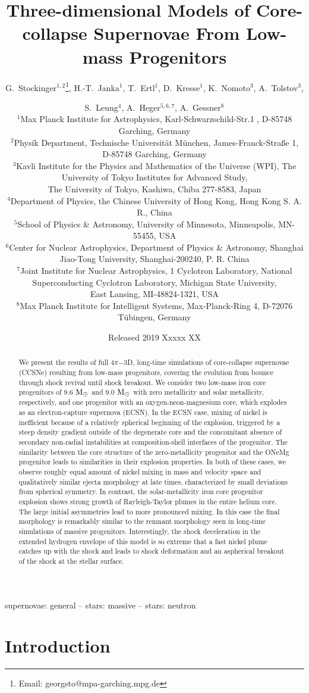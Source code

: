 \documentclass[fleqn,usenatbib]{mnras}
\title{Three-dimensional Models of Core-collapse Supernovae From Low-mass Progenitors}
\author[G. Stockinger et. al]{
 G.~Stockinger$^{1,2}$\thanks{Email: georgsto@mpa-garching.mpg.de},
 H.-T.~Janka$^1$,
 T.~Ertl$^1$,
 D.~Kresse$^1$,
 K.~Nomoto$^3$,
 A.~Tolstov$^3$,\and
 S.~Leung$^4$,
 A.~Heger$^{5,6,7}$,
 A.~Gessner$^8$
 \\
$^1$Max Planck Institute for Astrophysics, Karl-Schwarzschild-Str.1 , D-85748 Garching, Germany\\
$^2$Physik Department, Technische Universit\"at M\"unchen, James-Franck-Stra{\ss}e 1, D-85748 Garching, Germany\\
$^3$Kavli Institute for the Physics and Mathematics of the Universe (WPI), The University of Tokyo Institutes for Advanced Study,\\  \hspace{0.08cm} The University of Tokyo, Kashiwa, Chiba 277-8583, Japan\\
$^4$Department of Physics, the Chinese University of Hong Kong, Hong Kong S. A. R., China \\
$^5$School of Physics \& Astronomy, University of Minnesota, Minneapolis, MN-55455, USA \\
$^6$Center for Nuclear Astrophysics, Department of Physics \& Astronomy, Shanghai Jiao-Tong University, Shanghai-200240, P. R. China \\
$^7$Joint Institute for Nuclear Astrophysics, 1 Cyclotron Laboratory, National Superconducting Cyclotron Laboratory, Michigan State University,\\ \hspace{0.08cm} East Lansing, MI-48824-1321, USA \\
$^8$Max Planck Institute for Intelligent Systems, Max-Planck-Ring 4, D-72076 T\"ubingen, Germany \\
}
\date{Released 2019 Xxxxx XX}
\newcommand{\solm}{\ensuremath{\rm{M_{\odot}}}\xspace}
\begin{document}
\label{firstpage}
\pagerange{\pageref{firstpage}--\pageref{lastpage}}
\maketitle
{}

\begin{abstract}
We present the results of full $4\pi\mathord{-}$3D, long-time simulations 
of core-collapse supernovae (CCSNe) resulting from low-mass progenitors, 
covering the evolution from bounce through shock revival until shock breakout. 
We consider two low-mass iron core progenitors of 9.6 \solm and 9.0 \solm 
with zero metallicity and solar metallicity, respectively, and one 
progenitor with an oxygen-neon-magnesium core, which explodes as an 
electron-capture supernova (ECSN). In the ECSN case, mixing of nickel is 
inefficient because of a relatively spherical beginning of the explosion, 
triggered by a steep density gradient outside of the degenerate core and 
the concomitant absence of secondary non-radial instabilities at 
composition-shell interfaces of the progenitor. The similarity between the 
core structure of the zero-metallicity progenitor and the ONeMg progenitor 
leads to similarities in their explosion properties. In both of these cases, 
we observe roughly equal amount of nickel mixing in mass and velocity space 
and qualitatively similar ejecta morphology at late times, characterized by 
small deviations from spherical symmetry. In contrast, the solar-metallicity 
iron core progenitor explosion shows strong growth of Rayleigh-Taylor plumes 
in the entire helium core. The large initial asymmetries lead to more 
pronounced mixing. In this case the final morphology is remarkably similar 
to the remnant morphology seen in long-time simulations of massive progenitors. 
Interestingly, the shock deceleration in the extended hydrogen envelope of 
this model is so extreme that a fast nickel plume catches up with the 
shock and leads to shock deformation and an aspherical breakout of the 
shock at the stellar surface.
\end{abstract}

\begin{keywords}
  supernovae: general -- stars: massive -- stars: neutron
\end{keywords}

\noindent

\section{Introduction}
\end{document}
